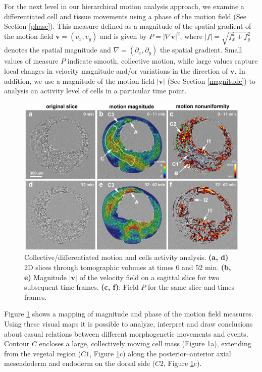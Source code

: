 For the next level in our hierarchical motion analysis approach, we examine a differentiated cell and tissue movements using a phase of the motion field (See Section \ref{phase}). This measure defined as a magnitude of the spatial gradient of the motion field $\textbf{v}=(v_x, v_y)$ and is given by $ P = |\nabla \textbf{v}|^2 $, where  $|f| = \sqrt{f^2_x + f^2_y}$ denotes the spatial magnitude and $\nabla = (\partial_{x}, \partial_{y})$ the spatial gradient.
Small values of measure $P$ indicate smooth, collective motion, while large values capture local changes in velocity magnitude and/or variations in the direction of $\textbf{v}$. In addition, we use a magnitude of the motion field $|\textbf{v}|$ (See Section \ref{magnitude}) to analysis an activity level of cells in a particular time point. 

\begin{figure}[ht]
  \centerline{
    \includegraphics[scale = 0.333]{figures/app_embryo_flow_analysis.PNG} 
  }  
  \caption{Collective/differentiated motion and cells activity analysis. \textbf{(a, d)} 2D slices through tomographic volumes at times 0 and 52 min.  \textbf{(b, e)} Magnitude $|\textbf{v}|$ of the velocity field on a sagittal slice for two subsequent time frames. \textbf{(c, f)}: Field $P$ for the same slice and times frames.}
  \label{fig:app_embryo_flow_analysis}
\end{figure}

Figure \ref{fig:app_embryo_flow_analysis} shows a mapping of magnitude and phase of the motion field measures. Using these visual maps it is possible to analyze, interpret and draw conclusions about casual relations between  different morphogenetic movements and events. Contour $C$ encloses a large, collectively moving cell mass
(Figure  \ref{fig:app_embryo_flow_analysis}a), extending from the vegetal region ($C1$, Figure \ref{fig:app_embryo_flow_analysis}c) along the
posterior–anterior axial mesendoderm and endoderm on the dorsal
side ($C2$, Figure \ref{fig:app_embryo_flow_analysis}c).



